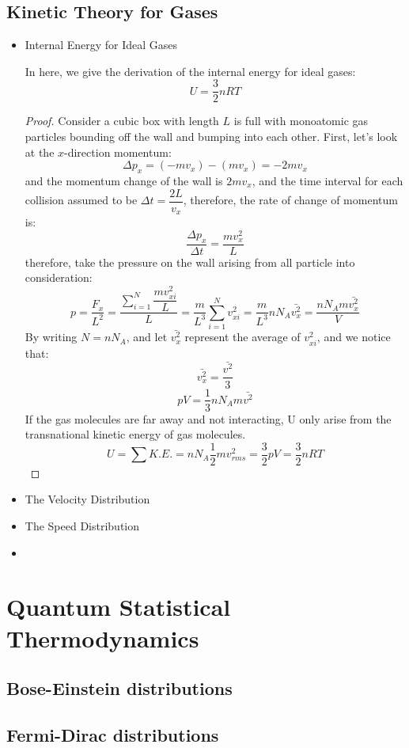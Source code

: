 \documentclass[UTF8]{book}
\begin{document}
\subsection{Kinetic Theory for Gases}
\begin{itemize}
\item Internal Energy for Ideal Gases

 {In here, we give the derivation of the internal energy for ideal gases: }
$$U=\dfrac{3}{2}nRT$$
\begin{proof}
 {Consider a cubic box with length $L$ is full with monoatomic gas particles bounding off the wall and bumping into each other. First, let's look at the $x$-direction momentum:}
$$\Delta p_x=(-mv_x)-(mv_x)=-2mv_x$$
 {and the momentum change of the wall is $2mv_x$, and the time interval for each collision assumed to be $\Delta t=\dfrac{2L}{v_x}$, therefore, the rate of change of momentum is:}
$$\dfrac{\Delta p_x}{\Delta t}=\dfrac{mv_x^2}{L}$$
 {therefore, take the pressure on the wall arising from all particle into consideration:}
$$p=\dfrac{F_x}{L^2}=\dfrac{\sum_{i=1}^{N}\dfrac{mv_{xi}^2}{L}}{L}=\dfrac{m}{L^3}\sum_{i=1}^{N}v_{xi}^2=\dfrac{m}{L^3}nN_A\bar{v_x^2}=\dfrac{nN_Am\bar{v_x^2}}{V}$$
 {By writing $N=nN_A$, and let $\bar{v_x^2}$ represent the average of $v_{xi}^2$, and we notice that:}
$$\bar{v_x^2}=\dfrac{\bar{v^2}}{3}$$
$$pV=\dfrac{1}{3}nN_Am\bar{v^2}$$
 {If the gas molecules are far away and not interacting, U only arise from the transnational kinetic energy of gas molecules.}
$$U=\sum K.E.=nN_A\dfrac{1}{2}mv_{rms}^2=\dfrac{3}{2}pV=\dfrac{3}{2}nRT$$
\end{proof}
\item  {The Velocity Distribution}

\item  {The Speed Distribution}
\item 
\end{itemize}

\section{Quantum Statistical Thermodynamics}
\subsection{Bose-Einstein distributions}
\subsection{Fermi-Dirac distributions}
\newpage
\end{document}

